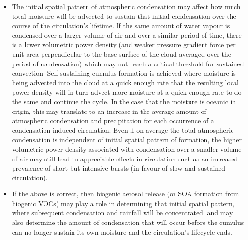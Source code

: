 \begin{itemize}
	\item The initial spatial pattern of atmospheric condensation may affect how much total moisture will be advected to sustain that initial condensation over the course of the circulation’s lifetime. If the same amount of water vapour is condensed over a larger volume of air and over a similar period of time, there is a lower volumetric power density (and weaker pressure gradient force per unit area perpendicular to the base surface of the cloud averaged over the period of condensation) which may not reach a critical threshold for sustained convection. Self-sustaining cumulus formation is achieved where moisture is being advected into the cloud at a quick enough rate that the resulting local power density will in turn advect more moisture at a quick enough rate to do the same and continue the cycle. In the case that the moisture is oceanic in origin, this may translate to an increase in the average amount of atmospheric condensation and precipitation for each occurrence of a condensation-induced circulation. Even if on average the total atmospheric condensation is independent of initial spatial pattern of formation, the higher volumetric power density associated with condensation over a smaller volume of air may still lead to appreciable effects in circulation such as an increased prevalence of short but intensive bursts (in favour of slow and sustained circulation).
	\item If the above is correct, then biogenic aerosol release (or \ac{SOA} formation from biogenic \ac{VOC}s) may play a role in determining that initial spatial pattern, where subsequent condensation and rainfall will be concentrated, and may also determine the amount of condensation that will occur before the cumulus can no longer sustain its own moisture and the circulation’s lifecycle ends.

\end{itemize}
